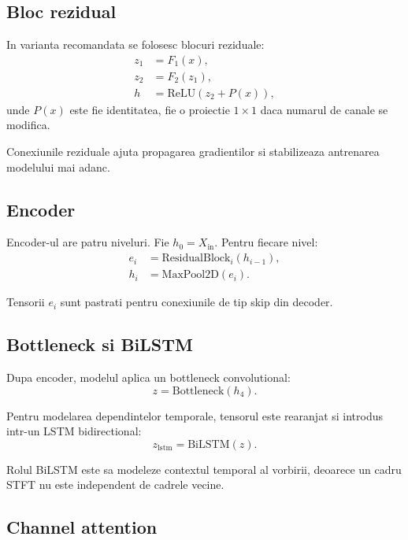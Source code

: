 \documentclass[12pt,a4paper]{article}
\begin{document}
\subsection{Bloc rezidual}

In varianta recomandata se folosesc blocuri reziduale:
\begin{align}
    z_1 &= F_1(x), \\
    z_2 &= F_2(z_1), \\
    h &= \mathrm{ReLU}(z_2 + P(x)),
\end{align}
unde $P(x)$ este fie identitatea, fie o proiectie $1 \times 1$ daca numarul de
canale se modifica.

Conexiunile reziduale ajuta propagarea gradientilor si stabilizeaza antrenarea
modelului mai adanc.

\subsection{Encoder}

Encoder-ul are patru niveluri. Fie $h_0 = X_{\mathrm{in}}$. Pentru fiecare nivel:
\begin{align}
    e_i &= \mathrm{ResidualBlock}_i(h_{i-1}), \\
    h_i &= \mathrm{MaxPool2D}(e_i).
\end{align}

Tensorii $e_i$ sunt pastrati pentru conexiunile de tip skip din decoder.

\subsection{Bottleneck si BiLSTM}

Dupa encoder, modelul aplica un bottleneck convolutional:
\begin{equation}
    z = \mathrm{Bottleneck}(h_4).
\end{equation}

Pentru modelarea dependintelor temporale, tensorul este rearanjat si introdus
intr-un LSTM bidirectional:
\begin{equation}
    z_{\mathrm{lstm}} = \mathrm{BiLSTM}(z).
\end{equation}

Rolul BiLSTM este sa modeleze contextul temporal al vorbirii, deoarece un cadru
STFT nu este independent de cadrele vecine.

\subsection{Channel attention}
\end{document}
